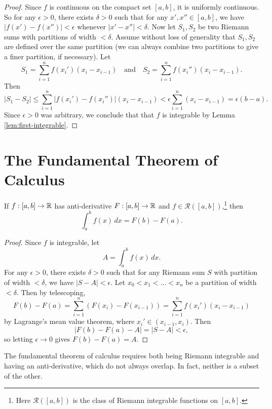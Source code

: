 \begin{proof}
  Since $f$ is continuous on the compact set $[a, b]$,
  it is uniformly continuous. So for any $\epsilon > 0$,
  there exists $\delta > 0$ such that for any
  $x', x'' \in [a, b]$, we have
  $|f(x') - f(x'')| < \epsilon$ whenever
  $|x' - x''| < \delta$. Now let $S_1, S_2$
  be two Riemann sums
  with partitions of width $< \delta$. Assume without
  loss of generality that $S_1, S_2$ are defined
  over the same partition (we can always combine two
  partitions to give a finer partition, if necessary).
  Let
  \[
    S_1 = \sum_{i = 1}^n f(x_i') (x_i - x_{i - 1})
    \quad \text{and} \quad
    S_2 = \sum_{i = 1}^n f(x_i'') (x_i - x_{i - 1}).
  \]
  Then
  \[
    |S_1 - S_2| \le \sum_{i = 1}^n |f(x_i') - f(x_i'')| (x_i - x_{i - 1})
    < \epsilon \sum_{i = 1}^n (x_i - x_{i - 1})
    = \epsilon (b - a).
  \]
  Since $\epsilon > 0$ was arbitrary, we conclude that
  that $f$ is integrable by Lemma \ref{lem:first-integrable}.
\end{proof}

\section{The Fundamental Theorem of Calculus}
\begin{theorem}
  If $f : [a, b] \to \mathbb{R}$ has anti-derivative
  $F : [a, b] \to \mathbb{R}$ and $f \in \mathcal{R}([a, b])$,\footnote{Here $\mathcal{R}([a, b])$ is the class of Riemann integrable functions on $[a, b]$.}
  then
  \[
    \int_a^b f(x)\, dx = F(b) - F(a).
  \]
\end{theorem}

\begin{proof}
  Since $f$ is integrable, let
  \[
    A = \int_a^b f(x)\, dx.
  \]
  For any $\epsilon > 0$, there exists $\delta > 0$
  such that for any Riemann sum $S$ with partition of
  width $< \delta$, we have $|S - A| < \epsilon$. Let
  $x_0 < x_1 < \dots < x_n$ be a partition of
  width $< \delta$. Then by telescoping,
  \[
    F(b) - F(a) = \sum_{i = 1}^n (F(x_i) - F(x_{i - 1}))
    = \sum_{i = 1}^n f(x_i') (x_i - x_{i - 1})
  \]
  by Lagrange's mean value theorem, where
  $x_i' \in (x_{i - 1}, x_i)$. Then
  \[
    |F(b) - F(a) - A| = |S - A| < \epsilon,
  \]
  so letting $\epsilon \to 0$ gives $F(b) - F(a) = A$.
\end{proof}

\begin{remark}
  The fundamental theorem of calculus requires both
  being Riemann integrable and having an anti-derivative,
  which do not always overlap. In fact, neither is
  a subset of the other.
\end{remark}

